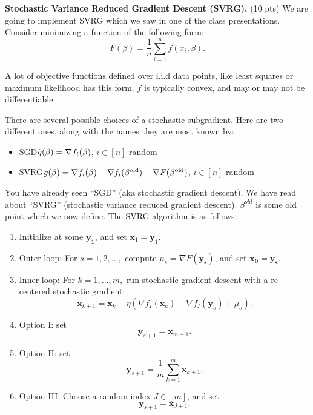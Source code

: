 \documentclass[12pt]{article}
\newcommand\tab[1][1cm]{\hspace*{#1}}
\newcommand{\bm}[1]{\boldsymbol{#1}}
\newcounter{choice}
\begin{document}
\item \textbf{Stochastic Variance Reduced Gradient Descent (SVRG).} (10 pts) We are going to implement SVRG which we saw in one of the class presentations. 
Consider minimizing a function of the following form:
$$F(\beta) = \frac{1}{n}\sum_{i=1}^n f(x_i,\beta).$$

A lot of objective functions defined over i.i.d data points, like least squares or maximum likelihood has this form. $f$ is typically convex, and may or may not be differentiable. 

There are several possible choices of a stochastic subgradient. Here are two different ones, along with the names they are most known by:
\begin{itemize}
    \item SGD\tab $\Tilde{g}(\beta)=\nabla f_i(\beta)$, $i \in [n]$ random
    \item SVRG\tab $\Tilde{g}(\beta)=\nabla f_i(\beta)+\nabla f_i(\beta^{\text{old}})-\nabla F(\beta^{\text{old}})$, $i \in [n]$ random
\end{itemize}
You have already seen  “SGD” (aka stochastic gradient descent). We have read about “SVRG” (stochastic variance reduced gradient descent).  $\beta^{old}$ is some old point which we now define. The SVRG algorithm is as follows: 
\begin{enumerate}[label=(\alph*)]
\item Initialize at some $\bm{y_1}$, and set $\bm{x}_1=\bm{y}_1$.

\item Outer loop: For $s = 1,2,...,$ compute $\mu_s = \nabla F(\bm{y_s})$, and set $\bm{x_0}=\bm{y_s}$.

\item  Inner loop: For $k = 1,...,m,$ run stochastic gradient descent with a re-centered stochastic gradient:
$$\bm{x}_{k+1}=\bm{x}_{k}-\eta(\nabla f_I(\bm{x}_k)-\nabla f_I(\bm{y}_s)+\mu_s).$$

\item Option I: set
$$\bm{y}_{s+1}=\bm{x}_{m+1}.$$

\item Option II: set
$$\bm{y}_{s+1}=\frac{1}{m}\sum_{k=1}^m \bm{x}_{k+1}.$$

\item Option III: Choose a random index $J \in [m]$, and set $$\bm{y}_{s+1}=\bm{x}_{J+1}.$$
\end{enumerate}
\end{document}
